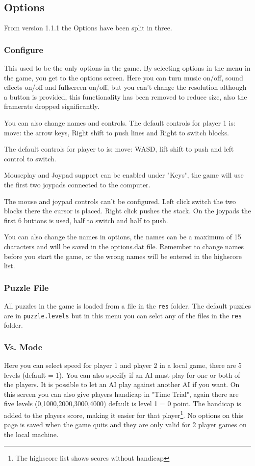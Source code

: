 \documentclass[11pt,a4paper]{article}
\begin{document}
\subsection{Options}
From version 1.1.1 the Options have been split in three.
\subsubsection{Configure}
This used to be the only options in the game.
By selecting options in the menu in the game, you get to the
options screen. Here you can turn music on/off, sound effects
on/off and fullscreen on/off, but you can't change the
resolution although a button is provided, this functionality has
been removed to reduce size, also the framerate dropped
significantly.

You can also change names and controls. The default controls for
player 1 is: move: the arrow keys, Right shift to push lines and
Right  to switch blocks.

The default controls for player to is: move: WASD, lift shift to
push and left control to switch.

Mouseplay and Joypad support can be enabled under "Keys", the game
will use the first two joypads connected to the computer.

The mouse and joypad controls can't be configured. Left click
switch the two blocks there the cursor is placed. Right click
pushes the stack. On the joypads the first 6 buttons is used, half
to switch and half to push.

You can also change the names in options, the names can be a
maximum of 15 characters and will be saved in the options.dat
file. Remember to change names before you start the game, or the
wrong names will be entered in the highscore list.
\subsubsection{Puzzle File}
All puzzles in the game is loaded from a file in the \verb+res+ folder. The default puzzles are in \verb+puzzle.levels+ but in this menu you can selct any of the files in the \verb+res+ folder.
\subsubsection{Vs. Mode}
Here you can select speed for player 1 and player 2 in a local game, there are 5 levels (default = 1). You can also specify if an AI must play for one or both of the players. It is possible to let an AI play against another AI if you want. On this screen you can also give players handicap in "Time Trial", again there are five levels (0,1000,2000,3000,4000) default is level 1 = 0 point. The handicap is added to the players score, making it easier for that player\footnote{The highscore list shows scores without handicap}. \newline
No options on this page is saved when the game quits and they are only valid for 2 player games on the local machine.
\end{document}
